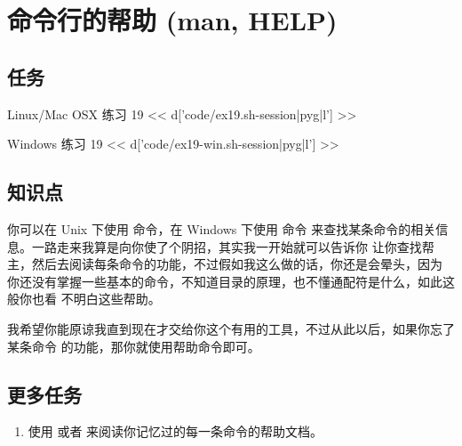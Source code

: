 \chapter{命令行的帮助 (man, HELP)}

\section{任务}

\begin{code}{Linux/Mac OSX 练习 19}
<< d['code/ex19.sh-session|pyg|l'] >>
\end{code}

\begin{code}{Windows 练习 19}
<< d['code/ex19-win.sh-session|pyg|l'] >>
\end{code}

\section{知识点}

你可以在 Unix 下使用  命令，在 Windows 下使用  命令
来查找某条命令的相关信息。一路走来我算是向你使了个阴招，其实我一开始就可以告诉你
让你查找帮主，然后去阅读每条命令的功能，不过假如我这么做的话，你还是会晕头，因为
你还没有掌握一些基本的命令，不知道目录的原理，也不懂通配符是什么，如此这般你也看
不明白这些帮助。

我希望你能原谅我直到现在才交给你这个有用的工具，不过从此以后，如果你忘了某条命令
的功能，那你就使用帮助命令即可。

\section{更多任务}

\begin{enumerate}
\item 使用  或者  来阅读你记忆过的每一条命令的帮助文档。
\end{enumerate}

